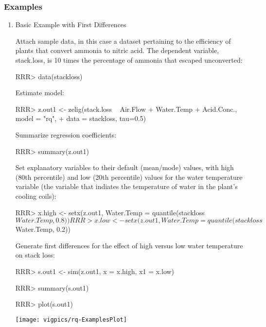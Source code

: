\subsubsection{Examples}
\begin{enumerate}
\item Basic Example with First Differences

Attach sample data, in this case a dataset pertaining to the efficiency of plants
that convert ammonia to nitric acid. The dependent variable, stack.loss, is 10 times
the percentage of ammonia that escaped unconverted:
\begin{Schunk}
\begin{Sinput}
RRR>  data(stackloss)
\end{Sinput}
\end{Schunk}
Estimate model:
\begin{Schunk}
\begin{Sinput}
RRR>  z.out1 <- zelig(stack.loss ~  Air.Flow + Water.Temp + Acid.Conc., model = "rq", 
+                 data = stackloss, tau=0.5)
\end{Sinput}
\end{Schunk}
Summarize regression coefficients:
\begin{Schunk}
\begin{Sinput}
RRR>  summary(z.out1)
\end{Sinput}
\end{Schunk}
Set explanatory variables to their default (mean/mode) values, with
high (80th percentile) and low (20th percentile) values for the water temperature
variable (the variable that indiates the temperature of water in the plant's cooling
coils):
\begin{Schunk}
\begin{Sinput}
RRR>  x.high <- setx(z.out1, Water.Temp = quantile(stackloss$Water.Temp, 0.8))
RRR>  x.low <- setx(z.out1, Water.Temp = quantile(stackloss$Water.Temp, 0.2))
\end{Sinput}
\end{Schunk}
Generate first differences for the effect of high versus low water temperature on
stack loss:
\begin{Schunk}
\begin{Sinput}
RRR>  s.out1 <- sim(z.out1, x = x.high, x1 = x.low)
\end{Sinput}
\end{Schunk}
\begin{Schunk}
\begin{Sinput}
RRR> summary(s.out1)
\end{Sinput}
\end{Schunk}
\begin{center}
\begin{Schunk}
\begin{Sinput}
RRR>  plot(s.out1)
\end{Sinput}
\end{Schunk}
\texttt{[image: vigpics/rq-ExamplesPlot]}
\end{center}


\end{enumerate}
